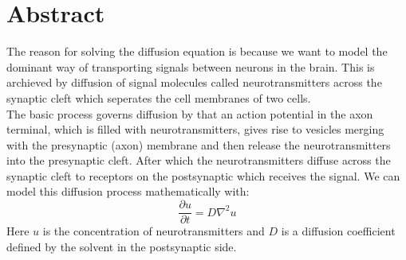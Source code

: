 \documentclass[a4paper,11pt]{article}
\newcommand{\prtl}{\partial} %
\newcommand{\secti}[1]{\centering \section{{#1}} \justifying} %
\begin{document}
\secti{Abstract}
    The reason for solving the diffusion equation is because we want to model the dominant way of transporting signals between neurons in the brain. This is archieved by diffusion of signal molecules called neurotransmitters across the synaptic cleft which seperates the cell membranes of two cells.\\
    The basic process governs diffusion by that an action potential in the axon terminal, which is filled with neurotransmitters, gives rise to vesicles merging with the presynaptic (axon) membrane and then release the neurotransmitters into the presynaptic cleft. After which the neurotransmitters diffuse across the synaptic cleft to receptors on the postsynaptic which receives the signal. We can model this diffusion process mathematically with:
    \begin{equation*}
        \frac{\prtl u}{\prtl t} = D\nabla^2 u
    \end{equation*}
    Here $u$ is the concentration of neurotransmitters and $D$ is a diffusion coefficient defined by the solvent in the postsynaptic side.
\end{document}
